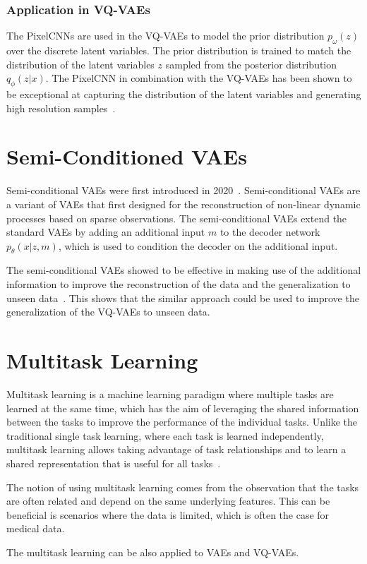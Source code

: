 \subsubsection{Application in VQ-VAEs}

The PixelCNNs are used in the VQ-VAEs to model the prior distribution $p_{\omega}(z)$ over the discrete latent variables. The prior distribution is trained to match the distribution of the latent variables $z$ sampled from the posterior distribution $q_{\phi}(z|x)$. The PixelCNN in combination with the VQ-VAEs has been shown to be exceptional at capturing the distribution of the latent variables and generating high resolution samples~\cite{vqvae}.

\section{Semi-Conditioned VAEs}

Semi-conditional VAEs were first introduced in 2020~\cite{Gundersen_2021}. Semi-conditional VAEs are a variant of VAEs that first designed for the reconstruction of non-linear dynamic processes based on sparse observations. The semi-conditional VAEs extend the standard VAEs by adding an additional input $m$ to the decoder network $p_{\theta}(x|z, m)$, which is used to condition the decoder on the additional input. 

The semi-conditional VAEs showed to be effective in making use of the additional information to improve the reconstruction of the data and the generalization to unseen data~\cite{Gundersen_2021}. This shows that the similar approach could be used to improve the generalization of the VQ-VAEs to unseen data.

\section{Multitask Learning}

Multitask learning is a machine learning paradigm where multiple tasks are learned at the same time, which has the aim of leveraging the shared information between the tasks to improve the performance of the individual tasks. Unlike the traditional single task learning, where each task is learned independently, multitask learning allows taking advantage of task relationships and to learn a shared representation that is useful for all tasks~\cite{multitasklearning}.

The notion of using multitask learning comes from the observation that the tasks are often related and depend on the same underlying features. This can be beneficial is scenarios where the data is limited, which is often the case for medical data. 

The multitask learning can be also applied to VAEs and VQ-VAEs. 








